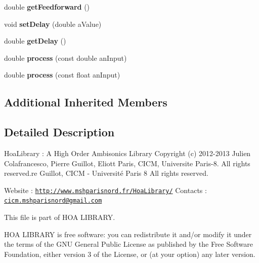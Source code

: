 \begin{DoxyCompactItemize}
\item 
\hypertarget{class_filter_comb_aa2b65087376a601550ce667d35fdd995}{double {\bfseries get\-Feedforward} ()}\label{class_filter_comb_aa2b65087376a601550ce667d35fdd995}

\item 
\hypertarget{class_filter_comb_a7e9b5eb88bfc496c2859684ee19cb1ad}{void {\bfseries set\-Delay} (double a\-Value)}\label{class_filter_comb_a7e9b5eb88bfc496c2859684ee19cb1ad}

\item 
\hypertarget{class_filter_comb_af17b0f4417bcb7e67b20e1835956966b}{double {\bfseries get\-Delay} ()}\label{class_filter_comb_af17b0f4417bcb7e67b20e1835956966b}

\item 
\hypertarget{class_filter_comb_aa40465e943220088a4736a38777402bd}{double {\bfseries process} (const double an\-Input)}\label{class_filter_comb_aa40465e943220088a4736a38777402bd}

\item 
\hypertarget{class_filter_comb_a283cb77e745ff50a72c65a7c97398421}{double {\bfseries process} (const float an\-Input)}\label{class_filter_comb_a283cb77e745ff50a72c65a7c97398421}

\end{DoxyCompactItemize}
\subsection*{Additional Inherited Members}


\subsection{Detailed Description}
Hoa\-Library \-: A High Order Ambisonics Library Copyright (c) 2012-\/2013 Julien Colafrancesco, Pierre Guillot, Eliott Paris, C\-I\-C\-M, Universite Paris-\/8. All rights reserved.\-re Guillot, C\-I\-C\-M -\/ Université Paris 8 All rights reserved.

Website \-: \href{http://www.mshparisnord.fr/HoaLibrary/}{\tt http\-://www.\-mshparisnord.\-fr/\-Hoa\-Library/} Contacts \-: \href{mailto:cicm.mshparisnord@gmail.com}{\tt cicm.\-mshparisnord@gmail.\-com}

This file is part of H\-O\-A L\-I\-B\-R\-A\-R\-Y.

H\-O\-A L\-I\-B\-R\-A\-R\-Y is free software\-: you can redistribute it and/or modify it under the terms of the G\-N\-U General Public License as published by the Free Software Foundation, either version 3 of the License, or (at your option) any later version.

